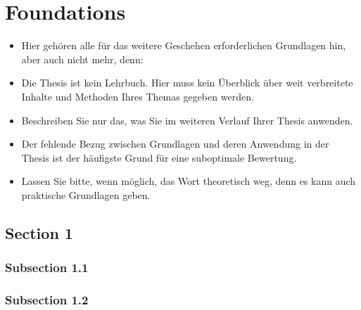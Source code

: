 
\chapter{Foundations} %

\label{chap:foundations}

\begin{itemize}
  \item Hier gehören alle für das weitere Geschehen erforderlichen Grundlagen hin, aber auch nicht mehr, denn:
  \item Die Thesis ist kein Lehrbuch. Hier muss kein Überblick über weit verbreitete Inhalte und Methoden Ihres Themas gegeben werden.
  \item Beschreiben Sie nur das, was Sie im weiteren Verlauf Ihrer Thesis anwenden.
  \item Der fehlende Bezug zwischen Grundlagen und deren Anwendung in der Thesis ist der häufigste Grund für eine suboptimale Bewertung.
  \item Lassen Sie bitte, wenn möglich, das Wort theoretisch weg, denn es kann auch praktische Grundlagen geben.
\end{itemize}

\section{Section 1}

\subsection{Subsection 1.1}



\subsection{Subsection 1.2}



